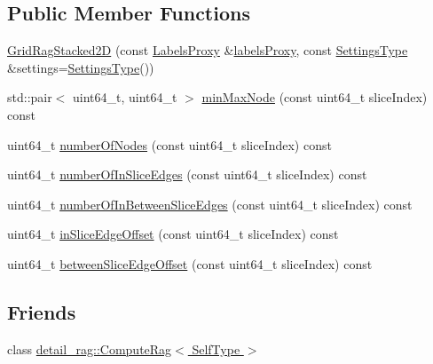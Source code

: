 \subsection*{Public Member Functions}
\begin{DoxyCompactItemize}
\item 
\hyperlink{classnifty_1_1graph_1_1GridRagStacked2D_a7dda5d4d4c9d873a6a52ae28b0bea026}{Grid\+Rag\+Stacked2\+D} (const \hyperlink{classnifty_1_1graph_1_1GridRagStacked2D_a09b44c819b97274a1025dc68cb6b3dc9}{Labels\+Proxy} \&\hyperlink{classnifty_1_1graph_1_1GridRag_a9a9b20451bd5ea8ce3ee11af4018c995}{labels\+Proxy}, const \hyperlink{classnifty_1_1graph_1_1GridRagStacked2D_abc778dc9bd7c20bacba215c1fc64ffb5}{Settings\+Type} \&settings=\hyperlink{classnifty_1_1graph_1_1GridRagStacked2D_abc778dc9bd7c20bacba215c1fc64ffb5}{Settings\+Type}())
\item 
std\+::pair$<$ uint64\+\_\+t, uint64\+\_\+t $>$ \hyperlink{classnifty_1_1graph_1_1GridRagStacked2D_ae7abe343f431f1a1ca953f3f9dd5e659}{min\+Max\+Node} (const uint64\+\_\+t slice\+Index) const 
\item 
uint64\+\_\+t \hyperlink{classnifty_1_1graph_1_1GridRagStacked2D_aa87c188ce0a2d246e1461bac64cf3a8a}{number\+Of\+Nodes} (const uint64\+\_\+t slice\+Index) const 
\item 
uint64\+\_\+t \hyperlink{classnifty_1_1graph_1_1GridRagStacked2D_a646bcd62254f454d3ac2e584b1b07428}{number\+Of\+In\+Slice\+Edges} (const uint64\+\_\+t slice\+Index) const 
\item 
uint64\+\_\+t \hyperlink{classnifty_1_1graph_1_1GridRagStacked2D_acfdac0e16539e96d36fdc1615e3e4ee1}{number\+Of\+In\+Between\+Slice\+Edges} (const uint64\+\_\+t slice\+Index) const 
\item 
uint64\+\_\+t \hyperlink{classnifty_1_1graph_1_1GridRagStacked2D_a111282918d5ef7ef97e4328d575b7089}{in\+Slice\+Edge\+Offset} (const uint64\+\_\+t slice\+Index) const 
\item 
uint64\+\_\+t \hyperlink{classnifty_1_1graph_1_1GridRagStacked2D_aa55f6424ed3ba64fe5cfc42b69876f8e}{between\+Slice\+Edge\+Offset} (const uint64\+\_\+t slice\+Index) const 
\end{DoxyCompactItemize}
\subsection*{Friends}
\begin{DoxyCompactItemize}
\item 
class \hyperlink{classnifty_1_1graph_1_1GridRagStacked2D_abafcbd3543961eb6e4ee794aa6a62d66}{detail\+\_\+rag\+::\+Compute\+Rag$<$ Self\+Type $>$}
\end{DoxyCompactItemize}
